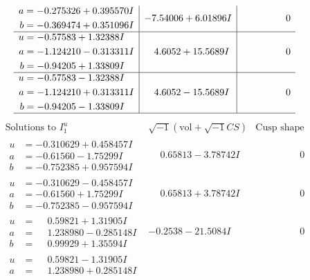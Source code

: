 \documentclass[1p]{elsarticle_modified}
\theoremstyle{definition}
\newcommand{\I}{\sqrt{-1}}
\begin{document}
$$\begin{array}{c|c|c}
\begin{aligned}
a &= -0.275326 + 0.395570 I \\
b &= -0.369474 + 0.351096 I\end{aligned}
 & -7.54006 + 6.01896 I & \phantom{-0.000000 } 0 \\ \hline\begin{aligned}
u &= -0.57583 + 1.32388 I \\
a &= -1.124210 - 0.313311 I \\
b &= -0.94205 + 1.33809 I\end{aligned}
 & \phantom{-}4.6052 + 15.5689 I & \phantom{-0.000000 } 0 \\ \hline\begin{aligned}
u &= -0.57583 - 1.32388 I \\
a &= -1.124210 + 0.313311 I \\
b &= -0.94205 - 1.33809 I\end{aligned}
 & \phantom{-}4.6052 - 15.5689 I & \phantom{-0.000000 } 0\\
 \hline 
 \end{array}$$\newpage$$\begin{array}{c|c|c}  
\text{Solutions to }I^u_{1}& \I (\text{vol} + \sqrt{-1}CS) & \text{Cusp shape}\\
 \hline 
\begin{aligned}
u &= -0.310629 + 0.458457 I \\
a &= -0.61560 - 1.75299 I \\
b &= -0.752385 + 0.957594 I\end{aligned}
 & \phantom{-}0.65813 - 3.78742 I & \phantom{-0.000000 } 0 \\ \hline\begin{aligned}
u &= -0.310629 - 0.458457 I \\
a &= -0.61560 + 1.75299 I \\
b &= -0.752385 - 0.957594 I\end{aligned}
 & \phantom{-}0.65813 + 3.78742 I & \phantom{-0.000000 } 0 \\ \hline\begin{aligned}
u &= \phantom{-}0.59821 + 1.31905 I \\
a &= \phantom{-}1.238980 - 0.285148 I \\
b &= \phantom{-}0.99929 + 1.35594 I\end{aligned}
 & -0.2538 - 21.5084 I & \phantom{-0.000000 } 0 \\ \hline\begin{aligned}
u &= \phantom{-}0.59821 - 1.31905 I \\
a &= \phantom{-}1.238980 + 0.285148 I \\

\end{aligned}
\end{array}$$
\end{document}
